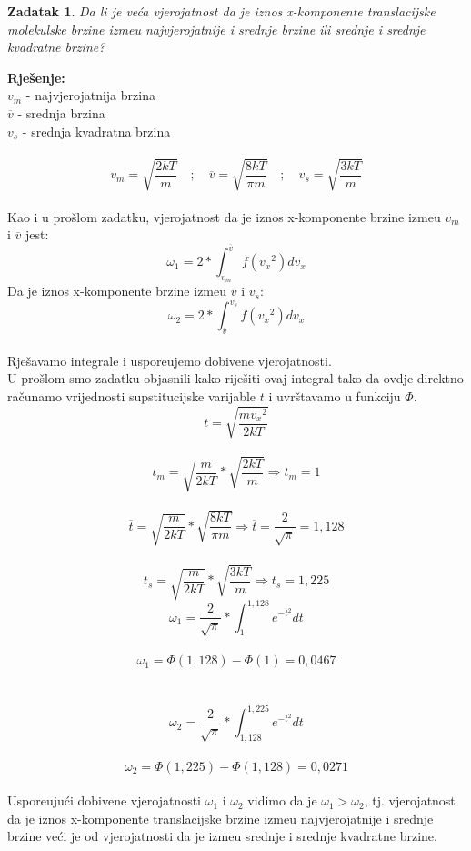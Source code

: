 \documentclass[a4paper,12pt]{article}
\newtheorem{ZDK}{Zadatak}[section]
\begin{document}
\newpage
\begin{ZDK}
	Da li je ve\'ca vjerojatnost da je iznos x-komponente translacijske molekulske brzine izme\dj u 
	najvjerojatnije i srednje brzine ili srednje i srednje kvadratne brzine?
\end{ZDK}
\textbf{Rje\v{s}enje:} \\
\newline
$v_m$ - najvjerojatnija brzina \\
$\overline{v}$ - srednja brzina \\
$v_s$ - srednja kvadratna brzina \\
\\
$$ v_m=\sqrt{\frac{2kT}{m}} \quad;\quad \overline{v}=\sqrt{\frac{8kT}{\pi m}} \quad;\quad v_s=\sqrt{\frac{3kT}{m}} $$
\\
Kao i u pro\v{s}lom zadatku, vjerojatnost da je iznos x-komponente brzine izme\dj u $v_m$ i $\overline{v}$ jest:
$$ \omega_1=2*\int_{v_m}^{\overline{v}}f({v_x}^2)dv_x $$
Da je iznos x-komponente brzine izme\dj u $\overline{v}$ i $v_s$:
$$ \omega_2=2*\int_{\overline{v}}^{v_s}f({v_x}^2)dv_x $$
\\
Rje\v{s}avamo integrale i uspore\dj ujemo dobivene vjerojatnosti. \\
U pro\v{s}lom smo zadatku objasnili kako rije\v{s}iti ovaj integral tako da ovdje direktno ra\v{c}unamo vrijednosti
supstitucijske varijable $t$ i uvr\v{s}tavamo u funkciju $\Phi$.
$$ t=\sqrt{\frac{m{v_x}^2}{2kT}} $$
\\
$$ t_m=\sqrt{\frac{m}{2kT}}*\sqrt{\frac{2kT}{m}} \Rightarrow t_m=1 $$
\\
$$ \overline{t}=\sqrt{\frac{m}{2kT}}*\sqrt{\frac{8kT}{\pi m}} \Rightarrow \overline{t}=\frac{2}{\sqrt{\pi}}=1,128 $$
\\
$$ t_s=\sqrt{\frac{m}{2kT}}*\sqrt{\frac{3kT}{m}} \Rightarrow t_s=1,225 $$
\newpage
$$ \omega_1=\frac{2}{\sqrt{\pi}}*\int_{1}^{1,128}e^{{-t}^2}dt $$
\\
$$ \omega_1=\Phi(1,128)-\Phi(1)=0,0467 $$
\\
\\
$$ \omega_2=\frac{2}{\sqrt{\pi}}*\int_{1,128}^{1,225}e^{{-t}^2}dt $$
\\
$$ \omega_2=\Phi(1,225)-\Phi(1,128)=0,0271 $$
\\
Uspore\dj uju\'ci dobivene vjerojatnosti $\omega_1$ i $\omega_2$ vidimo da je $\omega_1 > \omega_2$, tj.
vjerojatnost da je iznos x-komponente translacijske brzine izme\dj u najvjerojatnije i srednje brzine ve\'ci je  
od vjerojatnosti da je izme\dj u srednje i srednje kvadratne brzine. 
\end{document}
